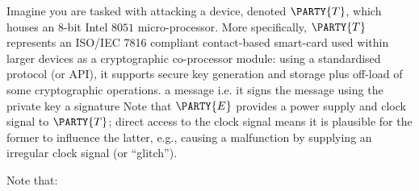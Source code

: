 %



Imagine you are tasked with attacking a device, denoted 
$\PARTY{T}$, 
which houses an $8$-bit Intel $8051$ micro-processor.  More specifically,
$\PARTY{T}$ 
represents an ISO/IEC 7816 compliant contact-based smart-card used within 
larger devices as a cryptographic co-processor module: 
using a standardised protocol (or API), it supports secure key generation 
and storage plus off-load of some cryptographic operations.
{a message}
{i.e. it signs the message using the private key}
{a signature}
Note that
$\PARTY{E}$ 
provides a power supply and clock signal to 
$\PARTY{T}$;
direct access to the 
clock signal
means it is plausible 
for the former to influence the latter, e.g., causing a malfunction by supplying an irregular clock signal (or ``glitch'').




%
Note that:


